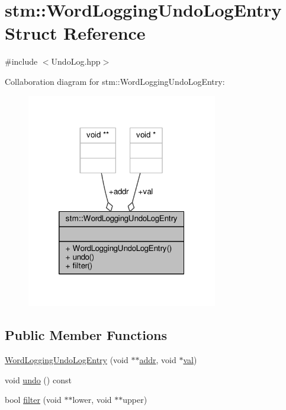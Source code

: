 \hypertarget{structstm_1_1WordLoggingUndoLogEntry}{\section{stm\-:\-:Word\-Logging\-Undo\-Log\-Entry Struct Reference}
\label{structstm_1_1WordLoggingUndoLogEntry}
}


{\ttfamily \#include $<$Undo\-Log.\-hpp$>$}



Collaboration diagram for stm\-:\-:Word\-Logging\-Undo\-Log\-Entry\-:
\nopagebreak
\begin{figure}[H]
\begin{center}
\leavevmode
\includegraphics[width=236pt]{structstm_1_1WordLoggingUndoLogEntry__coll__graph}
\end{center}
\end{figure}
\subsection*{Public Member Functions}
\begin{DoxyCompactItemize}
\item 
\hyperlink{structstm_1_1WordLoggingUndoLogEntry_a4a320a4b126844f0be3273bb00306f94}{Word\-Logging\-Undo\-Log\-Entry} (void $\ast$$\ast$\hyperlink{structstm_1_1WordLoggingUndoLogEntry_a5317c0c928e583bb016149d19cc65443}{addr}, void $\ast$\hyperlink{structstm_1_1WordLoggingUndoLogEntry_aa023a8d6d15f6b109aef96ac78a03469}{val})
\item 
void \hyperlink{structstm_1_1WordLoggingUndoLogEntry_ae9911b2f06d641f18f9df1a594d0ccd2}{undo} () const 
\item 
bool \hyperlink{structstm_1_1WordLoggingUndoLogEntry_a45e2a6bef5264ee30caef1f01376a8c7}{filter} (void $\ast$$\ast$lower, void $\ast$$\ast$upper)
\end{DoxyCompactItemize}
